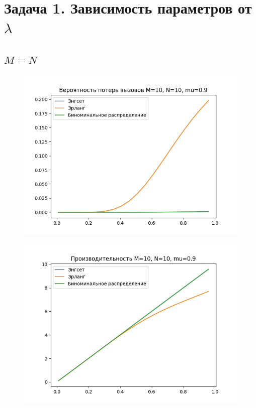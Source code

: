 \documentclass[12pt]{article}
\let\Oldsection\section
\renewcommand{\section}{\FloatBarrier\Oldsection}
\let\Oldsubsection\subsection
\renewcommand{\subsection}{\FloatBarrier\Oldsubsection}
\begin{document}
\section{Задача 1. Зависимость параметров от $\lambda$}\label{sec:result}

\subsection{$M = N$}\label{subsec:}

\begin{figure}[!htb]
\centering
\includegraphics[scale=1.00]{assets/iss_1/loss_prob_M10_N10_mu09.png}
\caption{}
\label{}
\end{figure}

\begin{figure}[!htb]
\centering
\includegraphics[scale=1.00]{assets/iss_1/perf_M10_N10_mu09.png}
\caption{}
\label{}
\end{figure}
\end{document}

